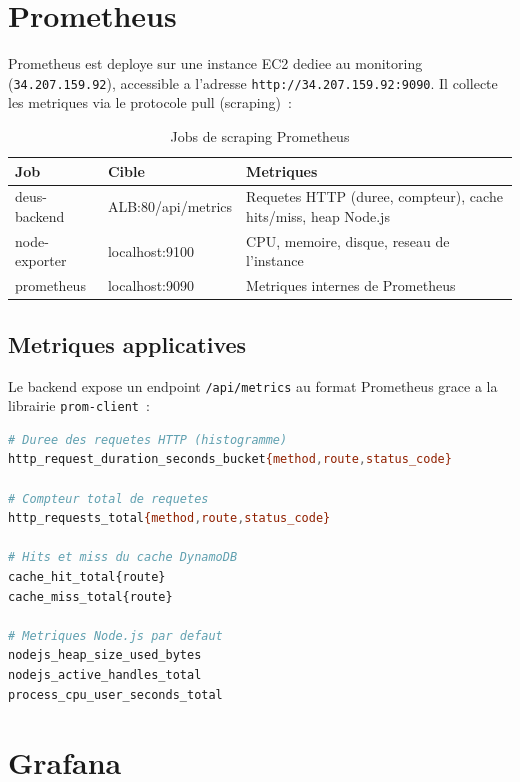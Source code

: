\section{Prometheus}

Prometheus est deploye sur une instance EC2 dediee au monitoring
(\texttt{34.207.159.92}), accessible a l'adresse
\texttt{http://34.207.159.92:9090}.
Il collecte les metriques via le protocole pull (scraping)~:

\begin{table}[H]
    \centering
    \begin{tabularx}{\textwidth}{llX}
        \toprule
        \textbf{Job} & \textbf{Cible} & \textbf{Metriques} \\
        \midrule
        deus-backend & ALB:80/api/metrics & Requetes HTTP (duree, compteur), cache hits/miss, heap Node.js \\
        node-exporter & localhost:9100 & CPU, memoire, disque, reseau de l'instance \\
        prometheus & localhost:9090 & Metriques internes de Prometheus \\
        \bottomrule
    \end{tabularx}
    \caption{Jobs de scraping Prometheus}
\end{table}

\subsection{Metriques applicatives}

Le backend expose un endpoint \texttt{/api/metrics} au format Prometheus
grace a la librairie \texttt{prom-client}~:

\begin{lstlisting}[language=bash,caption={Metriques exposees par le backend}]
# Duree des requetes HTTP (histogramme)
http_request_duration_seconds_bucket{method,route,status_code}

# Compteur total de requetes
http_requests_total{method,route,status_code}

# Hits et miss du cache DynamoDB
cache_hit_total{route}
cache_miss_total{route}

# Metriques Node.js par defaut
nodejs_heap_size_used_bytes
nodejs_active_handles_total
process_cpu_user_seconds_total
\end{lstlisting}

\section{Grafana}


